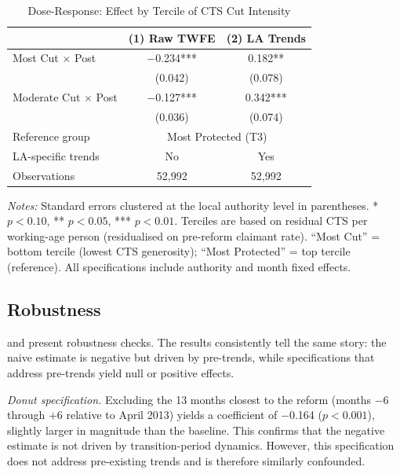 \documentclass[12pt]{article}
\begin{document}
\begin{table}[H]
\centering
\caption{Dose-Response: Effect by Tercile of CTS Cut Intensity}
\label{tab:dose}
\begin{threeparttable}
\begin{tabular}{lcc}
\toprule
& (1) Raw TWFE & (2) LA Trends \\
\midrule
Most Cut $\times$ Post & $-$0.234*** & 0.182** \\
& (0.042) & (0.078) \\
Moderate Cut $\times$ Post & $-$0.127*** & 0.342*** \\
& (0.036) & (0.074) \\
\addlinespace
Reference group & \multicolumn{2}{c}{Most Protected (T3)} \\
LA-specific trends & No & Yes \\
Observations & 52,992 & 52,992 \\
\bottomrule
\end{tabular}
\begin{tablenotes}[flushleft]
\small
\item \emph{Notes:} Standard errors clustered at the local authority level in parentheses. * $p<0.10$, ** $p<0.05$, *** $p<0.01$. Terciles are based on residual CTS per working-age person (residualised on pre-reform claimant rate). ``Most Cut'' = bottom tercile (lowest CTS generosity); ``Most Protected'' = top tercile (reference). All specifications include authority and month fixed effects.
\end{tablenotes}
\end{threeparttable}
\end{table}


\subsection{Robustness}

 and  present robustness checks. The results consistently tell the same story: the naive estimate is negative but driven by pre-trends, while specifications that address pre-trends yield null or positive effects.

\emph{Donut specification.} Excluding the 13 months closest to the reform (months $-6$ through $+6$ relative to April 2013) yields a coefficient of $-$0.164 ($p < 0.001$), slightly larger in magnitude than the baseline. This confirms that the negative estimate is not driven by transition-period dynamics. However, this specification does not address pre-existing trends and is therefore similarly confounded.
\end{document}
